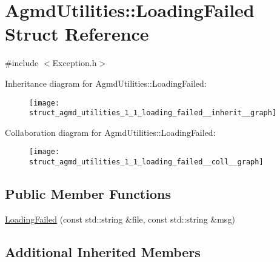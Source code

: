 \hypertarget{struct_agmd_utilities_1_1_loading_failed}{\section{Agmd\+Utilities\+:\+:Loading\+Failed Struct Reference}
\label{struct_agmd_utilities_1_1_loading_failed}
}


{\ttfamily \#include $<$Exception.\+h$>$}



Inheritance diagram for Agmd\+Utilities\+:\+:Loading\+Failed\+:\nopagebreak
\begin{figure}[H]
\begin{center}
\leavevmode
\texttt{[image: struct\_agmd\_utilities\_1\_1\_loading\_failed\_\_inherit\_\_graph]}
\end{center}
\end{figure}


Collaboration diagram for Agmd\+Utilities\+:\+:Loading\+Failed\+:\nopagebreak
\begin{figure}[H]
\begin{center}
\leavevmode
\texttt{[image: struct\_agmd\_utilities\_1\_1\_loading\_failed\_\_coll\_\_graph]}
\end{center}
\end{figure}
\subsection*{Public Member Functions}
\begin{DoxyCompactItemize}
\item 
\hyperlink{struct_agmd_utilities_1_1_loading_failed_a60b2e2d020e3983502b5cf41cae654a7}{Loading\+Failed} (const std\+::string \&file, const std\+::string \&msg)
\end{DoxyCompactItemize}
\subsection*{Additional Inherited Members}


